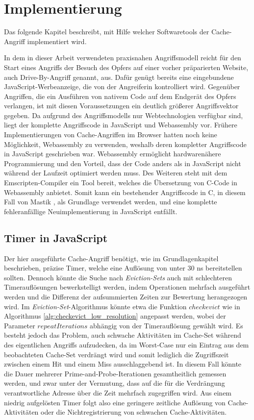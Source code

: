 \chapter{Implementierung}
\label{chapter:preparation}


Das folgende Kapitel beschreibt, mit Hilfe welcher Softwaretools der Cache-Angriff implementiert wird.

In dem in dieser Arbeit verwendeten praxisnahen Angriffsmodell reicht für den Start eines Angriffs der Besuch des Opfers auf einer vorher präparierten Website, auch Drive-By-Angriff genannt, aus. 
Dafür genügt bereits eine eingebundene JavaScript-Werbeanzeige, die von der Angreiferin kontrolliert wird. 
Gegenüber Angriffen, die ein Ausführen von nativem Code auf dem Endgerät des Opfers verlangen, ist mit diesen Voraussetzungen ein deutlich größerer Angriffsvektor gegeben.
Da aufgrund des Angriffsmodells nur Webtechnologien verfügbar sind, liegt der komplette Angriffscode in JavaScript und Webassembly vor. 
Frühere Implementierungen von Cache-Angriffen im Browser \cite{TheSpyInTheSandbox} hatten noch keine Möglichkeit, Webassembly zu verwenden, weshalb deren kompletter Angriffscode in JavaScript geschrieben war. 
Webassembly ermöglicht hardwarenähere Programmierung und den Vorteil, dass der Code anders als in JavaScript nicht während der Laufzeit optimiert werden muss. 
Des Weiteren steht mit dem Emscripten-Compiler ein Tool bereit, welches die Übersetzung von C-Code in Webassembly anbietet. Somit kann ein bestehender Angriffscode in C, in diesem Fall von Mastik \cite{Mastik}, als Grundlage verwendet werden, und eine komplette fehleranfällige Neuimplementierung in JavaScript entfällt.

\section{Timer in JavaScript}

Der hier ausgeführte Cache-Angriff benötigt, wie im Grundlagenkapitel beschrieben, präzise Timer, welche eine Auflösung von unter 30 ns bereitstellen sollten. Dennoch könnte die Suche nach \textit{Eviction-Sets} auch mit schlechteren Timerauflösungen bewerkstelligt werden, indem Operationen mehrfach ausgeführt werden und die Differenz der aufsummierten Zeiten zur Bewertung herangezogen wird.
Im \textit{Eviction-Set}-Algorithmus könnte etwa die Funktion $checkevict$ wie in Algorithmus \ref{alg:checkevict_low_resolution} angepasst werden, wobei der Parameter $repeatIterations$ abhängig von der Timerauflösung gewählt wird. 
Es besteht jedoch das Problem, auch schwache Aktivitäten im Cache-Set während des eigentlichen Angriffs aufzudecken, da im Worst-Case nur ein Eintrag aus dem beobachteten Cache-Set verdrängt wird und somit lediglich die Zugriffszeit zwischen einem Hit und einem Miss ausschlaggebend ist. 
In diesem Fall könnte die Dauer mehrerer Prime-and-Probe-Iterationen gesamtheitlich gemessen werden, und zwar unter der Vermutung, dass auf die für die Verdrängung verantwortliche Adresse über die Zeit mehrfach zugegriffen wird.
Aus einem niedrig aufgelösten Timer folgt also eine geringere zeitliche Auflösung von Cache-Aktivitäten oder die Nichtregistrierung von schwachen Cache-Aktivitäten.

